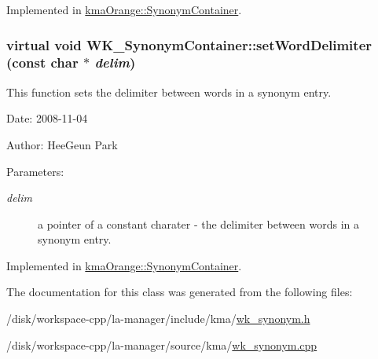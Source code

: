 Implemented in \hyperlink{classkmaOrange_1_1SynonymContainer_01bb87b5ceba481163ea282a459694f5}{kmaOrange::SynonymContainer}.\hypertarget{classWK__SynonymContainer_83e7c34dd30aad2478a58f324dcbd594}{
\subsubsection[{setWordDelimiter}]{\setlength{\rightskip}{0pt plus 5cm}virtual void WK\_\-SynonymContainer::setWordDelimiter (const char $\ast$ {\em delim})}}
\label{classWK__SynonymContainer_83e7c34dd30aad2478a58f324dcbd594}


This function sets the delimiter between words in a synonym entry. 

\begin{Desc}
\item[Date:]2008-11-04 \end{Desc}
\begin{Desc}
\item[Author:]HeeGeun Park \end{Desc}
\begin{Desc}
\item[Parameters:]
\begin{description}
\item[{\em delim}]a pointer of a constant charater - the delimiter between words in a synonym entry. \end{description}
\end{Desc}


Implemented in \hyperlink{classkmaOrange_1_1SynonymContainer_7e23aea8d7bb9b468a870f7e31ff6893}{kmaOrange::SynonymContainer}.

The documentation for this class was generated from the following files:\begin{CompactItemize}
\item 
/disk/workspace-cpp/la-manager/include/kma/\hyperlink{wk__synonym_8h}{wk\_\-synonym.h}\item 
/disk/workspace-cpp/la-manager/source/kma/\hyperlink{wk__synonym_8cpp}{wk\_\-synonym.cpp}\end{CompactItemize}
